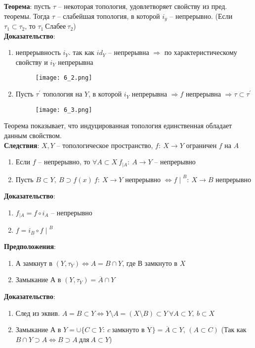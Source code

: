 	\textbf{Теорема}: пусть $\tau$ -- некоторая топология, удовлетворяет свойству из пред. теоремы. Тогда $\tau$ -- слабейшая топология, в которой $i_y$ -- непрерывно. (Если $\tau_1 \subset \tau_2$, то $\tau_1\ \text{Слабее}\ \tau_2$)\\
	\textbf{Доказательство}: 
	\begin{enumerate}
		\item 
		непрерывность $i_Y$. так как $id_Y$ -- непрерывна $\Rightarrow$ по характеристическому свойству и $i_Y$ непрерывна\\
		\begin{figure}[h!]
			\centering
			\texttt{[image: 6\_2.png]}
		\end{figure}
		\item 
		Пусть $\tau^{\prime}$ топология на $Y$, в которой $i_Y$ непрерывна $\Rightarrow f$ непрерывна $\Rightarrow \tau \subset \tau^{\prime}$\\
		\begin{figure}[h!]
			\centering
			\texttt{[image: 6\_3.png]}
		\end{figure}
	\end{enumerate}
	
	Теорема показывает, что индуцированная топология единственная обладает данным свойством.\\
	\textbf{Следствия}: $X, Y$ -- топологическое пространство, $f:\ X \rightarrow Y$ ограничен $f$ на $A$
	\begin{enumerate}
		\item 
		Если $f$ -- непрерывно, то $\forall A \subset X\ f_{\mid A}:\ A\rightarrow Y$ -- непрерывно
		\item 
		Пусть $B\subset Y,\ B \supset f(x)\ f:\ X\rightarrow Y$ непрерывно $\Leftrightarrow {f\mid}^B:\ X\rightarrow B$ непрерывно
	\end{enumerate}
	\textbf{Доказательство}: 
	\begin{enumerate}
		\item 
		$f_{\mid A} = f\circ i_A$ -- непрерывно
		\item 
		$f = i_B \circ {f\mid}^B$
	\end{enumerate}
	\textbf{Предположения}: 
	\begin{enumerate}
		\item 
		$А$ замкнут в $(Y,\tau_Y) \Leftrightarrow A = B \cap Y$, где $В$ замкнуто в $X$ 
		\item 
		Замыкание $А$ в $(Y,\tau_Y) = \overline{A} \cap Y$
	\end{enumerate}
	\textbf{Доказательство}:
	\begin{enumerate}
		\item 
		След из эквив. $A = B\subset Y \Leftrightarrow Y\setminus A = (X\setminus B)\subset Y\ \forall A\subset Y,\ b\subset X$ 
		\item 
		Замыкание $А$ в $Y = \cup \{C\subset Y:\ c\ \text{замкнуто в Y}\} = \overline{A}\subset Y$, $(A \subset C)$ (Так как $B\cap Y \supset A \Leftrightarrow B\supset A\ \text{для}\ A\subset Y$)
	\end{enumerate}


